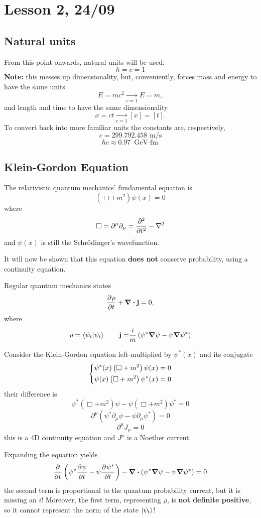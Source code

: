 \section{Lesson 2, 24/09}
\subsection{Natural units}
From this point onwards, natural units will be used:
$$\hbar = c = 1$$
\textbf{Note:} this messes up dimensionality, but, conveniently, forces mass and energy to have
the same units
$$E=mc^2\underset{c=1}\rightarrow E=m,$$
and length and time to have the same dimensionality
$$x=ct\underset{c=1}\rightarrow[x]=[t].$$
To convert back into more familiar units the constants are, respectively,
$$c=299.792.458\text{ m/s}$$
$$\hbar c \approx 0.97 \text{ GeV$\cdot$fm}$$
\subsection{Klein-Gordon Equation}
The relativistic quantum mechanics' fundamental equation is
$$(\Box+m^2)\psi(x)=0$$
where
$$\Box = \partial^\mu\partial_\mu=\pdv[2]{}{t}-\laplacian$$
and $\psi(x)$ is still the Schrödinger's wavefunction.

It will now be shown that this equation \textbf{does not} conserve probability, using a continuity
equation.

Regular quantum mechanics states
$$\pdv[]{\rho}{t}+\div\mathbf{j} = 0,$$
where
$$\rho=\bra{\psi_t}\ket{\psi_t}\quad\quad \mathbf{j=}\frac{i}{m}\left(\psi^*\grad\psi-\psi\grad\psi^*
\right)$$

Consider the Klein-Gordon equation left-multiplied by $\psi^*(x)$ and its conjugate
$$\begin{dcases}
  \psi^*(x)\left(\Box+m^2\right)\psi(x)=0\\
  \psi(x)\left(\Box+m^2\right)\psi^*(x)=0
  \end{dcases}$$
their difference is
$$\psi^*(\Box+m^2)\psi - \psi(\Box+m^2)\psi^*=0$$
$$\partial^\mu(\psi^*\partial_\mu\psi - \psi\partial_\mu\psi^*)=0$$
$$\partial^\mu J_\mu=0$$
this is a 4D continuity equation and $J^\mu$ is a Noether current.

Expanding the equation yields
$$\pdv[]{}{t}\left(\psi^*\pdv[]{\psi}{t}-\psi\pdv[]{\psi^*}{t}\right)-\div\left(\psi^*\grad \psi
-\psi\grad\psi^*\right)=0$$
the second term is proportional to the quantum probability current, but it is missing an $i$!
Moreover, the first term, representing $\rho$, is \textbf{not definite positive}, so it cannot
represent the norm of the state $\ket{\psi_t}$!\\

